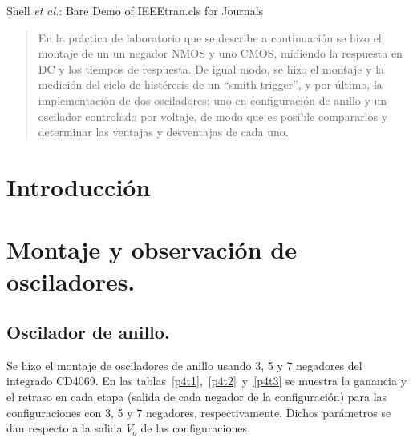 \documentclass[journal]{IEEEtran}
\begin{document}
\title{}
\author{}

\markboth{}%
{Shell \MakeLowercase{\textit{et al.}}: Bare Demo of IEEEtran.cls for Journals}

\maketitle

\begin{abstract}
En la práctica de laboratorio que se describe a continuación se hizo el montaje de un un negador NMOS y uno CMOS, midiendo la respuesta en DC y los tiempos de respuesta. De igual modo, se hizo el montaje y la medición del ciclo de histéresis de un ``smith  trigger'', y por último, la implementación de dos osciladores: uno en configuración de anillo y un oscilador controlado por voltaje, de modo que es posible compararlos y determinar las ventajas y desventajas de cada uno.
\end{abstract}

\begin{IEEEkeywords}

\end{IEEEkeywords}

\IEEEpeerreviewmaketitle

\section{Introducción}



\section{Montaje y observación de osciladores.}
\subsection{Oscilador de anillo.}
Se hizo el montaje de osciladores de anillo usando 3, 5 y 7 negadores del integrado CD4069.
En las tablas~\ref{p4t1},~\ref{p4t2}~y~\ref{p4t3} se muestra la ganancia y el retraso en cada etapa (salida de cada negador de la configuración) para las configuraciones con 3, 5 y 7 negadores, respectivamente. Dichos parámetros se dan respecto a la salida $V_o$ de las configuraciones.
\end{document}
